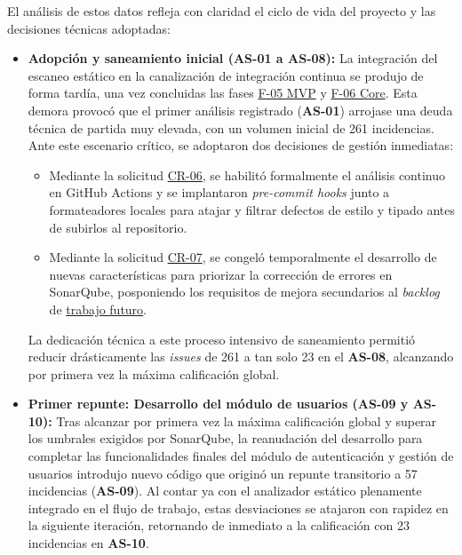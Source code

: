 El análisis de estos datos refleja con claridad el ciclo de vida del proyecto y las decisiones técnicas adoptadas:

\begin{itemize}
    \item \textbf{Adopción y saneamiento inicial (AS-01 a AS-08):} 
    La integración del escaneo estático en la canalización de integración continua se produjo de forma tardía, una vez concluidas las fases \hyperref[fase:mvp]{F-05 MVP} y \hyperref[fase:core]{F-06 Core}. Esta demora provocó que el primer análisis registrado (\textbf{AS-01}) arrojase una deuda técnica de partida muy elevada, con un volumen inicial de 261 incidencias. Ante este escenario crítico, se adoptaron dos decisiones de gestión inmediatas:
    \begin{itemize}
        \item Mediante la solicitud \hyperref[tab:cr_06_sonar]{CR-06}, se habilitó formalmente el análisis continuo en GitHub Actions y se implantaron \textit{pre-commit hooks} junto a formateadores locales para atajar y filtrar defectos de estilo y tipado antes de subirlos al repositorio.
        \item Mediante la solicitud \hyperref[tab:cr_07_backlog]{CR-07}, se congeló temporalmente el desarrollo de nuevas características para priorizar la corrección de errores en SonarQube, posponiendo los requisitos de mejora secundarios al \textit{backlog} de \hyperref[sec:trabajo_futuro]{trabajo futuro}.
    \end{itemize}
    La dedicación técnica a este proceso intensivo de saneamiento permitió reducir drásticamente las \textit{issues} de 261 a tan solo 23 en el \textbf{AS-08}, alcanzando por primera vez la máxima calificación global.

    \item \textbf{Primer repunte: Desarrollo del módulo de usuarios (AS-09 y AS-10):}
    Tras alcanzar por primera vez la máxima calificación global y superar los umbrales exigidos por SonarQube, la reanudación del desarrollo para completar las funcionalidades finales del módulo de autenticación y gestión de usuarios introdujo nuevo código que originó un repunte transitorio a 57 incidencias (\textbf{AS-09}). Al contar ya con el analizador estático plenamente integrado en el flujo de trabajo, estas desviaciones se atajaron con rapidez en la siguiente iteración, retornando de inmediato a la calificación    con 23 incidencias en \textbf{AS-10}.


\end{itemize}
